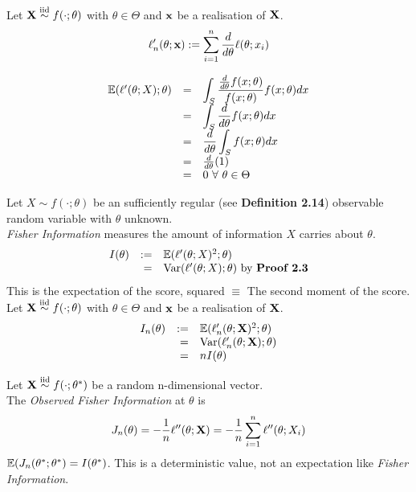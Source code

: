 \documentclass[11pt,a4paper]{article}
\begin{document}
Let $\textbf{X}\overset{\text{iid}}{\sim} f(\cdot;\theta)$ with $\theta\in\Theta$ and $\textbf{x}$ be a realisation of $\textbf{X}$.
$$\ell'_n(\theta;\textbf{x}):=\sum_{i=1}^n\frac{d}{d\theta}\ell(\theta;x_i)$$

\[\begin{array}{rcl}
\mathbb{E}(\ell'(\theta;X);\theta)&=&{\displaystyle\int_S\dfrac{\frac{d}{d\theta}f(x;\theta)}{f(x;\theta)}f(x;\theta)dx}\\
&=&{\displaystyle\int_S\frac{d}{d\theta}f(x;\theta)dx}\\
&=&{\displaystyle\frac{d}{d\theta}\int_Sf(x;\theta)dx}\\
&=&\frac{d}{d\theta}(1)\\
&=&0\ \forall\ \theta\in\Theta
\end{array}\]

Let $X\sim f(\cdot;\theta)$ be an sufficiently regular (see \textbf{Definition 2.14}) observable random variable with $\theta$ unknown.\\
\textit{Fisher Information} measures the amount of information $X$ carries about $\theta$.
\[\begin{array}{rrl}
I(\theta)&:=&\mathbb{E}(\ell'(\theta;X)^2;\theta)\\
&=&\mathrm{Var}(\ell'(\theta;X);\theta)\text{ by \textbf{Proof 2.3}}
\end{array}\]
\nb This is the expectation of the score, squared $\equiv$ The second moment of the score.\\

Let $\textbf{X}\overset{\text{iid}}{\sim} f(\cdot;\theta)$ with $\theta\in\Theta$ and $\textbf{x}$ be a realisation of $\textbf{X}$.
\[\begin{array}{rrl}
I_n(\theta)&:=&\mathbb{E}(\ell'_n(\theta;\textbf{X})^2;\theta)\\
&=&\mathrm{Var}(\ell'_n(\theta;\textbf{X});\theta)\\
&=&nI(\theta)
\end{array}\]

Let $\textbf{X}\overset{\text{iid}}{\sim} f(\cdot;\theta^*)$ be a random n-dimensional vector.\\
The \textit{Observed Fisher Information} at $\theta$ is
$$J_n(\theta)=-\frac{1}{n}\ell''(\theta;\textbf{X})=-\frac{1}{n}\sum_{i=1}^n\ell''(\theta;X_i)$$
\nb $\mathbb{E}(J_n(\theta^*;\theta^*)=I(\theta^*)$. This is a deterministic value, not an expectation like \textit{Fisher Information}.\\
\end{document}
